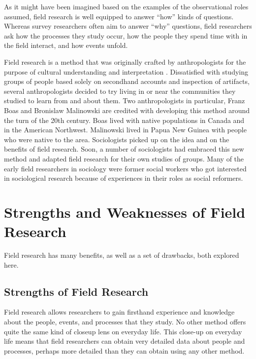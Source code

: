 As it might have been imagined based on the examples of the observational roles assumed, field research is well equipped to answer ``how'' kinds of questions. Whereas survey researchers often aim to answer ``why'' questions, field researchers ask how the processes they study occur, how the people they spend time with in the field interact, and how events unfold. 

Field research is a method that was originally crafted by anthropologists for the purpose of cultural understanding and interpretation \cite{wolcott1999ethnography}. Dissatisfied with studying groups of people based solely on secondhand accounts and inspection of artifacts, several anthropologists decided to try living in or near the communities they studied to learn from and about them. Two anthropologists in particular, Franz Boas \cite{boas1964central} and Bronislaw Malinowski \cite{malinowski2014argonauts} are credited with developing this method around the turn of the 20th century. Boas lived with native populations in Canada and in the American Northwest. Malinowski lived in Papua New Guinea with people who were native to the area. Sociologists picked up on the idea and on the benefits of field research. Soon, a number of sociologists had embraced this new method and adapted field research for their own studies of groups. Many of the early field researchers in sociology were former social workers who got interested in sociological research because of experiences in their roles as social reformers. 

\section{Strengths and Weaknesses of Field Research}

Field research has many benefits, as well as a set of drawbacks, both explored here.

\subsection{Strengths of Field Research}

Field research allows researchers to gain firsthand experience and knowledge about the people, events, and processes that they study. No other method offers quite the same kind of closeup lens on everyday life. This close-up on everyday life means that field researchers can obtain very detailed data about people and processes, perhaps more detailed than they can obtain using any other method.

